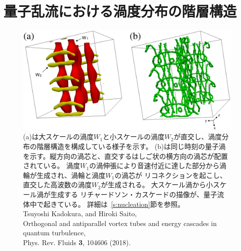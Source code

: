 \documentclass[12pt,a4paper]{jbook}
\begin{document}
	\chapter{量子乱流における渦度分布の階層構造}
    \label{c:orth}
		\begin{figure}[H]
			\begin{center}
			\includegraphics[width=14cm]{cascade.eps}
			\caption{
				(a)は大スケールの渦度$W_1$と小スケールの渦度$W_2$が直交し、渦度分布の階層構造を構成している様子を示す。
                (b)は同じ時刻の量子渦を示す。縦方向の渦芯と、直交するはしご状の横方向の渦芯が配置されている。
                渦度$W_1$の渦伸張により音速付近に達した部分から渦輪が生成され、渦輪と渦度$W_1$の渦芯が
                リコネクションを起こし、直交した高波数の渦度$W_2$が生成される。
                大スケール渦から小スケール渦が生成する
                リチャードソン・カスケードの描像が、量子流体中で起きている。
                詳細は~\ref{s:nucleation}節を参照。
                \\
		        Tsuyoshi Kadokura, and Hiroki Saito,
                \\
		        Orthogonal and antiparallel vortex tubes and energy cascades in quantum turbulence,
                \\
		        Phys. Rev. Fluids {\bf 3}, 104606 (2018).
			}
			\label{FIG:cascade}
			\end{center}
		\end{figure}
\end{document}

